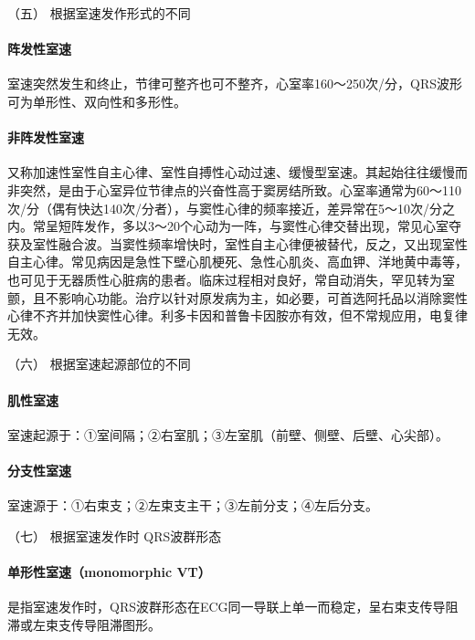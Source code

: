 \hypertarget{text00292.htmlux5cux23CHP10-2-5-2-3-5}{}
（五） 根据室速发作形式的不同

\paragraph{阵发性室速}

室速突然发生和终止，节律可整齐也可不整齐，心室率160～250次/分，QRS波形可为单形性、双向性和多形性。

\paragraph{非阵发性室速}

又称加速性室性自主心律、室性自搏性心动过速、缓慢型室速。其起始往往缓慢而非突然，是由于心室异位节律点的兴奋性高于窦房结所致。心室率通常为60～110次/分（偶有快达140次/分者），与窦性心律的频率接近，差异常在5～10次/分之内。常呈短阵发作，多以3～20个心动为一阵，与窦性心律交替出现，常见心室夺获及室性融合波。当窦性频率增快时，室性自主心律便被替代，反之，又出现室性自主心律。常见病因是急性下壁心肌梗死、急性心肌炎、高血钾、洋地黄中毒等，也可见于无器质性心脏病的患者。临床过程相对良好，常自动消失，罕见转为室颤，且不影响心功能。治疗以针对原发病为主，如必要，可首选阿托品以消除窦性心律不齐并加快窦性心律。利多卡因和普鲁卡因胺亦有效，但不常规应用，电复律无效。

\hypertarget{text00292.htmlux5cux23CHP10-2-5-2-3-6}{}
（六） 根据室速起源部位的不同

\paragraph{肌性室速}

室速起源于：①室间隔；②右室肌；③左室肌（前壁、侧壁、后壁、心尖部）。

\paragraph{分支性室速}

室速源于：①右束支；②左束支主干；③左前分支；④左后分支。

\hypertarget{text00292.htmlux5cux23CHP10-2-5-2-3-7}{}
（七） 根据室速发作时 QRS波群形态

\paragraph{单形性室速（monomorphic VT）}

是指室速发作时，QRS波群形态在ECG同一导联上单一而稳定，呈右束支传导阻滞或左束支传导阻滞图形。

